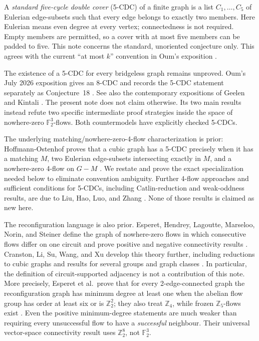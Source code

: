 \documentclass[11pt]{article}
\theoremstyle{definition}
\theoremstyle{remark}
\newcommand{\F}{\mathbb F}
\begin{document}
A \emph{standard five-cycle double cover} (5-CDC) of a finite graph is a
list \(C_1,\ldots,C_5\) of Eulerian edge-subsets such that every edge
belongs to exactly two members.  Here Eulerian means even degree at every
vertex; connectedness is not required.  Empty members are permitted, so a
cover with at most five members can be padded to five.  This note concerns
the standard, unoriented conjecture only.  This agrees with the current
``at most \(k\)'' convention in Oum's exposition
\cite[Section~9.1]{oum2026}.

The existence of a 5-CDC for every bridgeless graph remains unproved.
Oum's July 2026 exposition gives an 8-CDC and records the 5-CDC statement
separately as Conjecture~18 \cite[Section~9.1]{oum2026}.  See also the
contemporary expositions of Geelen and Kintali
\cite{geelen2026,kintali2026}.  The
present note does not claim otherwise.  Its two main results instead
refute two specific intermediate proof strategies inside the space of
nowhere-zero \(\F_2^3\)-flows.  Both countermodels have explicitly
checked 5-CDCs.

The underlying matching/nowhere-zero-4-flow characterization is prior:
Hoffmann-Ostenhof proves that a cubic graph has a 5-CDC precisely when it
has a matching \(M\), two Eulerian edge-subsets intersecting exactly in
\(M\), and a nowhere-zero 4-flow on \(G-M\)
\cite[Corollary~0.6]{hoffmann2013}.  We restate and prove the exact
specialization needed below to eliminate convention ambiguity.
Further 4-flow approaches and sufficient conditions for 5-CDCs, including
Catlin-reduction and weak-oddness results, are due to Liu, Hao, Luo, and
Zhang \cite{liu2023,liu2025}.  None of those results is claimed as new
here.

The reconfiguration language is also prior.  Esperet, Hendrey, Lagoutte,
Marseloo, Norin, and Steiner define the graph of nowhere-zero flows in
which consecutive flows differ on one circuit and prove positive and
negative connectivity results \cite{esperet2025}.  Cranston, Li, Su,
Wang, and Xu develop this theory further, including reductions to cubic
graphs and results for several groups and graph classes
\cite{cranston2026}.  In particular, the definition of circuit-supported
adjacency is not a contribution of this note.  More precisely, Esperet
et al.\ prove that for every 2-edge-connected graph the reconfiguration
graph has minimum degree at least one when the abelian flow group has
order at least six or is \(\mathbb Z_2^2\); they also treat
\(\mathbb Z_4\), while frozen \(\mathbb Z_5\)-flows exist
\cite{esperet2025}.  Even the positive minimum-degree statements are much
weaker than requiring every unsuccessful flow to have a
\emph{successful} neighbour.  Their universal vector-space connectivity
result uses \(\mathbb Z_2^8\), not \(\F_2^3\).
\end{document}
